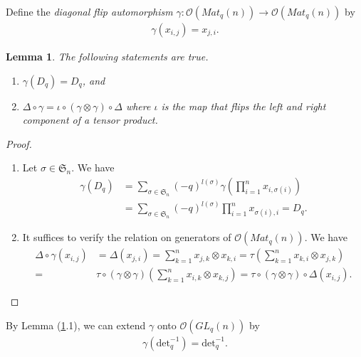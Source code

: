 \documentclass[table,a4paper,reqno]{amsart}
\numberwithin{equation}{section}
\newtheorem{lemma}[theorem]{Lemma}
\theoremstyle{definition}
\begin{document}
Define the \textit{diagonal flip automorphism} $\gamma:\mathcal{O}(Mat_q(n))\rightarrow \mathcal{O}(Mat_q(n))$ by
\begin{align}\label{eq:3.50}
    \gamma(x_{i,j})=x_{j,i}.
\end{align}
\begin{lemma}\label{lemma:3.8}
    The following statements are true.
    \begin{enumerate}
        \item[1] $\gamma(D_q)=D_q$, and
        \item[2] $\Delta\circ\gamma=\iota\circ(\gamma\otimes\gamma)\circ\Delta$ where $\iota$ is the map that flips the left and right component of a tensor product. 
    \end{enumerate}
\end{lemma}
\begin{proof}
\begin{enumerate}
    \item[1.] Let $\sigma\in\mathfrak{S}_n$. We have
    \begin{equation}
        \begin{split}
            \gamma(D_q)&=\sum_{\sigma\in\mathfrak{S}_n}(-q)^{l(\sigma)}\gamma\left(\prod_{i=1}^nx_{i,\sigma(i)}\right)\\
            &=\sum_{\sigma\in\mathfrak{S}_n}(-q)^{l(\sigma)}\prod_{i=1}^nx_{\sigma(i),i}=D_q.
        \end{split}
    \end{equation}
    \item[2.] It suffices to verify the relation on generators of $\mathcal{O}(Mat_q(n))$. We have
    \begin{equation}
        \begin{split}
            \Delta\circ\gamma(x_{i,j})&=\Delta(x_{j,i})=\sum_{k=1}^nx_{j,k}\otimes x_{k,i}=\tau\left(\sum_{k=1}^nx_{k,i}\otimes x_{j,k}\right)\\
        =&\tau\circ(\gamma\otimes\gamma)\left(\sum_{k=1}^nx_{i,k}\otimes x_{k,j}\right)=\tau\circ(\gamma\otimes\gamma)\circ\Delta(x_{i,j}).
        \end{split}
    \end{equation}
\end{enumerate}
\end{proof}
By Lemma (\ref{lemma:3.8}.1), we can extend $\gamma$ onto $\mathcal{O}(GL_q(n))$ by 
\begin{align}
    \gamma(\text{det}_q^{-1})=\text{det}_q^{-1}.
\end{align}
\end{document}
